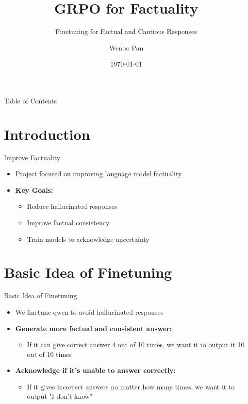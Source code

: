 \documentclass[aspectratio=169]{beamer}
\title{GRPO for Factuality}
\subtitle{Finetuning for Factual and Cautious Responses}
\author{Wenbo Pan}
\date{\today}
\begin{document}
\begin{frame}
    \titlepage
\end{frame}

\begin{frame}{Table of Contents}
    \tableofcontents
\end{frame}

\section{Introduction}
\begin{frame}{Improve Factuality}
    \begin{itemize}
        \item Project focused on improving language model factuality
        \item \textbf{Key Goals:} 
        \begin{itemize}
            \item Reduce hallucinated responses
            \item Improve factual consistency
            \item Train models to acknowledge uncertainty
        \end{itemize}
    \end{itemize}
\end{frame}

\section{Basic Idea of Finetuning}
\begin{frame}{Basic Idea of Finetuning}
    \begin{itemize}
        \item We finetune qwen to avoid hallucinated responses
        \item \textbf{Generate more factual and consistent answer:}
        \begin{itemize}
            \item If it can give correct answer 4 out of 10 times, we want it to output it 10 out of 10 times
        \end{itemize}
        \item \textbf{Acknowledge if it's unable to answer correctly:}
        \begin{itemize}
            \item If it gives incorrect answers no matter how many times, we want it to output "I don't know"
        \end{itemize}
    \end{itemize}
\end{frame}
\end{document}
